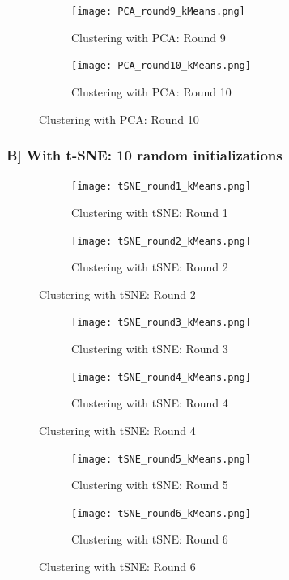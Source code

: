 \documentclass[a4paper,11pt]{article}
\begin{document}
\begin{mlsolution}
\begin{figure}[!htbp]
	\begin{subfigure}{.5\textwidth}
		\centering
		\texttt{[image: PCA\_round9\_kMeans.png]}
		\caption{Clustering with PCA: Round 9}
		\label{pca9}
	\end{subfigure}%
	\begin{subfigure}{.5\textwidth}
		\centering
		\texttt{[image: PCA\_round10\_kMeans.png]}
		\caption{Clustering with PCA: Round 10}
		\label{pca10}
	\end{subfigure}
\end{figure}

\pagebreak

\subsubsection{B] With t-SNE: 10 random initializations}

\begin{figure}[!htbp]
	\begin{subfigure}{.5\textwidth}
		\centering
		\texttt{[image: tSNE\_round1\_kMeans.png]}
		\caption{Clustering with tSNE: Round 1}
		\label{tSNE1}
	\end{subfigure}%
	\begin{subfigure}{.5\textwidth}
		\centering
		\texttt{[image: tSNE\_round2\_kMeans.png]}
		\caption{Clustering with tSNE: Round 2}
		\label{tSNE2}
	\end{subfigure}
\end{figure}

\begin{figure}[!htbp]
	\begin{subfigure}{.5\textwidth}
		\centering
		\texttt{[image: tSNE\_round3\_kMeans.png]}
		\caption{Clustering with tSNE: Round 3}
		\label{tSNE3}
	\end{subfigure}%
	\begin{subfigure}{.5\textwidth}
		\centering
		\texttt{[image: tSNE\_round4\_kMeans.png]}
		\caption{Clustering with tSNE: Round 4}
		\label{tSNE4}
	\end{subfigure}
\end{figure}

\begin{figure}[!htbp]
	\begin{subfigure}{.5\textwidth}
		\centering
		\texttt{[image: tSNE\_round5\_kMeans.png]}
		\caption{Clustering with tSNE: Round 5}
		\label{tSNE5}
	\end{subfigure}%
	\begin{subfigure}{.5\textwidth}
		\centering
		\texttt{[image: tSNE\_round6\_kMeans.png]}
		\caption{Clustering with tSNE: Round 6}
		\label{tSNE6}
	\end{subfigure}
\end{figure}


\end{mlsolution}
\end{document}

